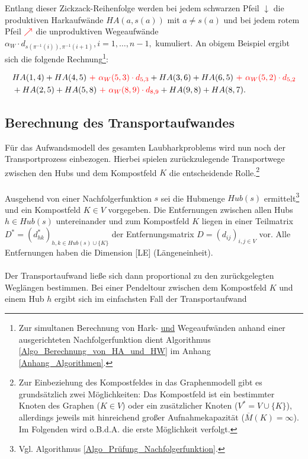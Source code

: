 \documentclass[fontsize=12pt,doubleside,openany,listof=totoc,listof=flat,listof=nochaptergap,numbers=noenddot]{scrbook}
\theoremstyle{style}
\begin{document}
\noindent Entlang dieser Zickzack-Reihenfolge werden bei jedem schwarzen Pfeil $\downarrow$ die produktiven Harkaufwände $HA(a,s(a))$ mit $a\neq s(a)$ und bei jedem rotem Pfeil $\textcolor{red}{\bf{\nearrow}}$ die unproduktiven Wegeaufwände $\alpha_W\cdot d_{s(\pi^{-1}(i)),\pi^{-1}(i+1)}, i=1,\dots,n-1,$ kumuliert. An obigem Beispiel ergibt sich die folgende Rechnung\footnote{Zur simultanen Berechnung von Hark- \underline{und} Wegeaufwänden anhand einer ausgerichteten Nachfolgerfunktion dient Algorithmus \ref{Algo_Berechnung_von_HA_und_HW} im Anhang \ref{Anhang_Algorithmen}.}:

\begin{align*}
&HA(1,4) + HA(4,5) \text{ } \textcolor{red}{+ \text{ } \alpha_W(5,3)\cdot d_{5,3}} + HA(3,6) + HA(6,5) \text{ } \textcolor{red}{+ \text{ } \alpha_W(5,2)\cdot d_{5,2}} \\&+ HA(2,5) + HA(5,8) \text{ } \textcolor{red}{+ \text{ } \alpha_W(8,9)\cdot d_{8,9}} + HA(9,8) + HA(8,7).
\end{align*}	



\subsection{Berechnung des Transportaufwandes}
\label{subsectionTransportaufwandsberechnung}

\noindent Für das Aufwandsmodell des gesamten Laubharkproblems wird 
nun noch der Transportprozess einbezogen. Hierbei spielen zurückzulegende 
Transportwege zwischen den Hubs und dem Kompostfeld\label{Kompostfeld} $K$ die entscheidende Rolle.\footnote{Zur Einbeziehung des Kompostfeldes in das Graphenmodell gibt es grundsätzlich zwei Möglichkeiten: Das Kompostfeld ist ein bestimmter Knoten des Graphen ($K \in V$) oder ein zusätzlicher Knoten ($V^* = V\cup \{K\}$), allerdings jeweils mit hinreichend großer Aufnahmekapazität ($\overline{M}(K)=\infty$). Im Folgenden wird o.B.d.A. die erste Möglichkeit verfolgt.}\\
\\
Ausgehend von einer Nachfolgerfunktion $s$ sei die Hubmenge $Hub(s)$ ermittelt\footnote{Vgl. Algorithmus \ref{Algo_Prüfung_Nachfolgerfunktion}.} und ein Kompostfeld $K \in V$ vorgegeben. Die Entfernungen zwischen allen Hubs $h \in Hub(s)$ untereinander und zum Kompostfeld $K$ liegen in einer Teilmatrix $D^*=(d^*_{hk})_{h,k \in Hub(s)\cup \{K\}}$ der Entfernungsmatrix $D=(d_{ij})_{i,j \in V}$ vor. Alle Entfernungen haben die Dimension [LE] (Längeneinheit).\\
\\
Der Transportaufwand ließe sich dann proportional zu den zurückgelegten 
Weglängen bestimmen. Bei einer Pendeltour zwischen dem Kompostfeld $K$ und 
einem Hub $h$ ergibt sich im einfachsten Fall der Transportaufwand
\end{document}
